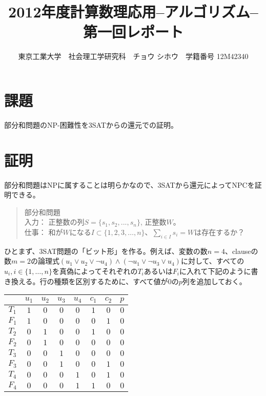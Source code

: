 \documentclass{jsarticle}
\title{2012年度計算数理応用--アルゴリズム-- 第一回レポート}
\author{東京工業大学　社会理工学研究科　チョウ シホウ　学籍番号 12M42340}
\begin{document}
\maketitle

\section{課題}
部分和問題のNP-困難性を3SATからの還元での証明。

\section{証明}
部分和問題はNPに属することは明らかなので、3SATから還元によってNPCを証明できる。
\begin{quote}
部分和問題\\
入力： 正整数の列$ S=\{s_{1},s_{2},...,s_{n}\}$, 正整数$W$。\\
仕事： 和が$W$になる$I \subset \{1,2,3, \dots, n \}$、$ \sum_{i \in I}s_{i}=W $は存在するか？
\end{quote}

ひとまず、3SAT問題の「ビット形」を作る。例えば、変数の数$n=4$、clauseの数$m=2$の論理式$(u_{1} \vee u_{2} \vee \neg u_{4} )\wedge(\neg u_{1} \vee \neg u_{3} \vee u_{4})$に対して、すべての$u_{i},i \in \{1,\dots,n\} $を真偽によってそれぞれの$T_{i}$あるいは$F_{i}$に入れて下記のように書き換える。行の種類を区別するために、すべて値が$0$の$p$列を追加しておく。

\begin{center}
\begin{tabular}{ c| c c c c c c | c }
  &  $u_{1}$ & $u_{2}$ & $u_{3}$ & $u_{4}$ & $c_{1}$ & $c_{2}$ & $p$\\
   \hline  
  $T_{1}$ & $1$ & $0$ & $0$ & $0$ & $1$ & $0$ & $0$\\
  $F_{1}$ & $1$ & $0$ & $0$ & $0$ & $0$ & $1$ & $0$\\
  $T_{2}$ & $0$ & $1$ & $0$ & $0$ & $1$ & $0$ & $0$\\
  $F_{2}$ & $0$ & $1$ & $0$ & $0$ & $0$ & $0$ & $0$\\
  $T_{3}$ & $0$ & $0$ & $1$ & $0$ & $0$ & $0$ & $0$\\
  $F_{3}$ & $0$ & $0$ & $1$ & $0$ & $0$ & $1$ & $0$\\
  $T_{4}$ & $0$ & $0$ & $0$ & $1$ & $0$ & $1$ & $0$\\
  $F_{4}$ & $0$ & $0$ & $0$ & $1$ & $1$ & $0$ & $0$\\

\end{tabular}
\end{center}
\end{document}
